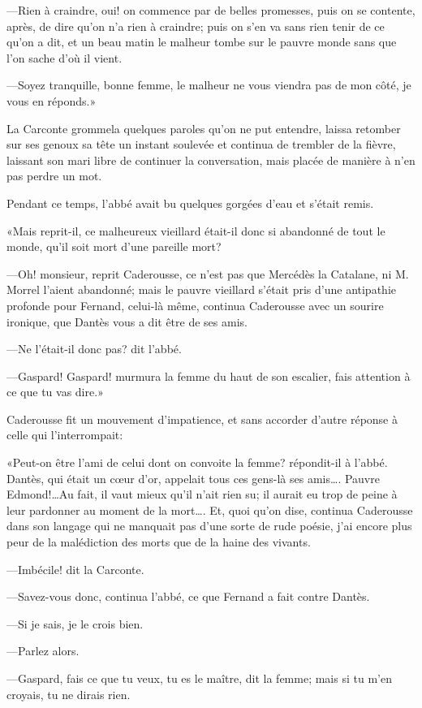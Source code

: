 —Rien à craindre, oui! on commence par de belles promesses, puis on se contente, après, de dire qu'on n'a rien à craindre; puis on s'en va sans rien tenir de ce qu'on a dit, et un beau matin le malheur tombe sur le pauvre monde sans que l'on sache d'où il vient.

—Soyez tranquille, bonne femme, le malheur ne vous viendra pas de mon côté, je vous en réponds.»

La Carconte grommela quelques paroles qu'on ne put entendre, laissa retomber sur ses genoux sa tête un instant soulevée et continua de trembler de la fièvre, laissant son mari libre de continuer la conversation, mais placée de manière à n'en pas perdre un mot.

Pendant ce temps, l'abbé avait bu quelques gorgées d'eau et s'était remis.

«Mais reprit-il, ce malheureux vieillard était-il donc si abandonné de tout le monde, qu'il soit mort d'une pareille mort?

—Oh! monsieur, reprit Caderousse, ce n'est pas que Mercédès la Catalane, ni M. Morrel l'aient abandonné; mais le pauvre vieillard s'était pris d'une antipathie profonde pour Fernand, celui-là même, continua Caderousse avec un sourire ironique, que Dantès vous a dit être de ses amis.

—Ne l'était-il donc pas? dit l'abbé.

—Gaspard! Gaspard! murmura la femme du haut de son escalier, fais attention à ce que tu vas dire.»

Caderousse fit un mouvement d'impatience, et sans accorder d'autre réponse à celle qui l'interrompait:

«Peut-on être l'ami de celui dont on convoite la femme? répondit-il à l'abbé. Dantès, qui était un cœur d'or, appelait tous ces gens-là ses amis\dots. Pauvre Edmond!\dots Au fait, il vaut mieux qu'il n'ait rien su; il aurait eu trop de peine à leur pardonner au moment de la mort\dots. Et, quoi qu'on dise, continua Caderousse dans son langage qui ne manquait pas d'une sorte de rude poésie, j'ai encore plus peur de la malédiction des morts que de la haine des vivants.

—Imbécile! dit la Carconte.

—Savez-vous donc, continua l'abbé, ce que Fernand a fait contre Dantès.

—Si je sais, je le crois bien.

—Parlez alors.

—Gaspard, fais ce que tu veux, tu es le maître, dit la femme; mais si tu m'en croyais, tu ne dirais rien.

